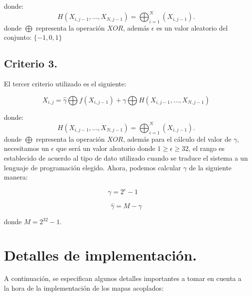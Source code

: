 \documentclass[12pt,3p]{elsarticle}
\begin{document}
donde:
\begin{equation}
H(X_{i,j-1},...,X_{N,j-1}) = \bigoplus _{i=1}^{N}(X_{i,j-1}).
\end{equation}
donde $\bigoplus$ representa la operación $XOR$, además $\epsilon$ es un valor aleatorio del conjunto: ${\{-1, 0, 1 \}}$



\subsection{Criterio 3.}

El tercer criterio utilizado es el siguiente:

\begin{equation}
X_{i,j}= \hat{\gamma} \bigoplus f(X_{i,j-1})+ \gamma \bigoplus H(X_{i,j-1},...,X_{N,j-1})
\end{equation}

donde:
\begin{equation}
H(X_{i,j-1},...,X_{N,j-1}) = \bigoplus _{i=1}^{N}(X_{i,j-1}).
\end{equation}
donde $\bigoplus$ representa la operación $XOR$, además para el cálculo del valor de $\gamma$, necesitamos un $\epsilon$ que será un valor aleatorio donde $1 \geq \epsilon \geq 32$, el rango es establecido de acuerdo al tipo de dato utilizado cuando se traduce el sistema a un lenguaje de programación elegido. Ahora, podemos calcular $\gamma$ de la siguiente manera:

\begin{equation}
\gamma = 2^{\epsilon}-1 \quad  
\end{equation}

\begin{equation}
\hat{\gamma} = M - \gamma
\end{equation}

donde $M = 2^{32}-1$.


\section{Detalles de implementación.}
A continuación, se especifican algunos detalles importantes a tomar en cuenta a la hora de la implementación de los mapas acoplados:
\end{document}
